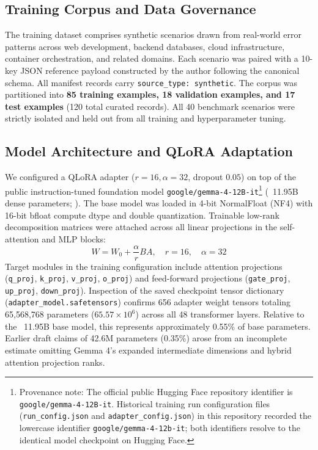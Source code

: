\documentclass[11pt,a4paper]{article}
\begin{document}
\subsection{Training Corpus and Data Governance}
The training dataset comprises synthetic scenarios drawn from real-world error patterns across web development, backend databases, cloud infrastructure, container orchestration, and related domains. Each scenario was paired with a 10-key JSON reference payload constructed by the author following the canonical schema. All manifest records carry \texttt{source\_type: synthetic}. The corpus was partitioned into \textbf{85 training examples, 18 validation examples, and 17 test examples} (120 total curated records). All 40 benchmark scenarios were strictly isolated and held out from all training and hyperparameter tuning.

\subsection{Model Architecture and QLoRA Adaptation}
We configured a QLoRA adapter ($r=16, \alpha=32$, dropout $0.05$) on top of the public instruction-tuned foundation model \texttt{google/gemma-4-12B-it}\footnote{Provenance note: The official public Hugging Face repository identifier is \texttt{google/gemma-4-12B-it}. Historical training run configuration files (\texttt{run\_config.json} and \texttt{adapter\_config.json}) in this repository recorded the lowercase identifier \texttt{google/gemma-4-12b-it}; both identifiers resolve to the identical model checkpoint on Hugging Face.} (~11.95B dense parameters; \cite{gemma2026report,google2026gemma4model}). The base model was loaded in 4-bit NormalFloat (NF4) with 16-bit bfloat compute dtype and double quantization. Trainable low-rank decomposition matrices were attached across all linear projections in the self-attention and MLP blocks:
\begin{equation}
W = W_0 + \frac{\alpha}{r}BA, \quad r = 16, \quad \alpha = 32
\end{equation}
Target modules in the training configuration include attention projections (\texttt{q\_proj}, \texttt{k\_proj}, \texttt{v\_proj}, \texttt{o\_proj}) and feed-forward projections (\texttt{gate\_proj}, \texttt{up\_proj}, \texttt{down\_proj}). Inspection of the saved checkpoint tensor dictionary (\texttt{adapter\_model.safetensors}) confirms 656 adapter weight tensors totaling 65,568,768 parameters ($65.57\times 10^6$) across all 48 transformer layers. Relative to the ~11.95B base model, this represents approximately 0.55\% of base parameters. Earlier draft claims of 42.6M parameters (0.35\%) arose from an incomplete estimate omitting Gemma 4's expanded intermediate dimensions and hybrid attention projection ranks.
\end{document}
